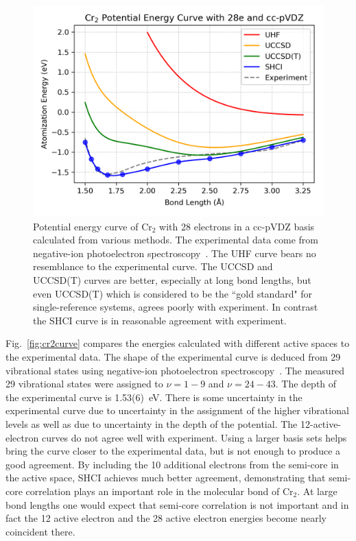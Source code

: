 \begin{figure}
  \begin{center}
  \includegraphics[width=0.9\linewidth]{figs/hfcc.png}
  \caption{Potential energy curve of Cr$_2$ with 28 electrons in a cc-pVDZ basis calculated from various methods.
  The experimental data come from negative-ion photoelectron spectroscopy~\cite{casey1993negative}.
  The UHF curve bears no resemblance to the experimental curve.
  The UCCSD and UCCSD(T) curves are better, especially at long bond lengths, but even UCCSD(T) which is considered to be the ``gold standard" for single-reference
  systems, agrees poorly with experiment.  In contrast the SHCI curve is in reasonable agreement with experiment.
}
  \label{fig:hfcc}
  \end{center}
\end{figure}

Fig.~\ref{fig:cr2curve} compares the energies calculated with different active spaces to the experimental data.
The shape of the experimental curve is deduced from 29 vibrational states using negative-ion photoelectron spectroscopy~\cite{casey1993negative}.
The measured 29 vibrational states were assigned to $\nu=1-9$ and $\nu=24-43$.
The depth of the experimental curve is 1.53(6)~eV.
There is some uncertainty in the experimental curve due to uncertainty in the assignment of the higher vibrational levels
as well as due to uncertainty in the depth of the potential.
The 12-active-electron curves do not agree well with experiment.
Using a larger basis sets helps bring the curve closer to the experimental data, but is not enough to produce a good agreement.
By including the 10 additional electrons from the semi-core in the active space, SHCI achieves much better agreement,
demonstrating that semi-core correlation plays an important role in the molecular bond of Cr$_2$.
At large bond lengths one would expect that semi-core correlation is not important and in fact the 12 active electron
and the 28 active electron energies become nearly coincident there.

